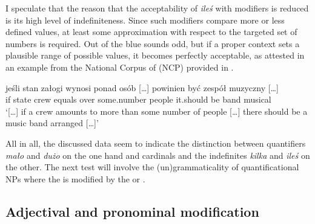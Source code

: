 \documentclass[output=paper, newtxmath, colorlinks, citecolor=brown]{langsci/langscibook}
\begin{document}
\begin{multicols}{2}
		\ea \label{ex:numeral-modifiers-iles} \label{ex:numeral-modifiers-iles-ponad}
	\columnbreak
		\z
        \z

	\end{multicols}

	\noindent I speculate that the reason that the acceptability of \textit{ileś} with  modifiers is reduced is its high level of indefiniteness. Since such modifiers compare more or less defined values, at least some approximation with respect to the targeted set of numbers is required. Out of the blue  sounds odd, but if a proper context sets a plausible range of possible values, it becomes perfectly acceptable, as attested in an example from the National Corpus of  (NCP) provided in .

	\ea \gll [\dots] jeśli stan załogi wynosi ponad  osób [\dots] powinien być zespół muzyczny [\dots]\\
	{} if state crew equals over some.number people {} it.should be band musical\\
	\glt `[\dots] if a crew amounts to more than some number of people [\dots] there should be a music band arranged [\dots]'\label{ex:numeral-modifiers-iles-ncp}
    \z

\noindent	All in all, the discussed data seem to indicate the distinction between quantifiers \textit{mało} and \textit{dużo} on the one hand and cardinals and the indefinites \textit{kilka} and \textit{ileś} on the other. The next test will involve the (un)grammaticality of quantificational NPs where the  is modified by the  or  .

	\subsection{Adjectival and pronominal modification}\label{sec:adjectival-and pronominal-modification}
\end{document}

